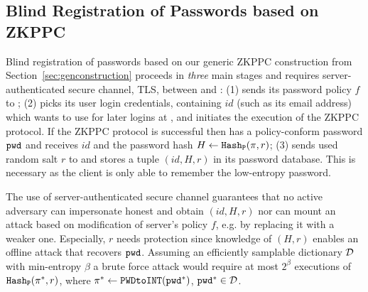 %


\subsection{Blind Registration of Passwords based on ZKPPC}\label{sec:pwreg}
Blind registration of passwords based on our generic \ac{ZKPPC} construction from Section~\ref{sec:genconstruction} proceeds in \emph{three} main stages and requires server-authenticated secure channel, \eg \ac{TLS}, between \Client and \Server: 
(1) \Server sends its password policy $f$ to \Client; 
(2) \Client picks its user login credentials, containing $id$ (such as its email address) which \Client wants to use for later logins at \Server, and initiates the execution of the \ac{ZKPPC} protocol. 
If the \ac{ZKPPC} protocol is successful then \Client has a policy-conform password $\mathtt{pwd}$ and \Server receives $id$ and the password hash $H\gets\mathtt{Hash_P}(\pi,r)$; 
(3) \Client sends used random salt $r$ to \Server and \Server stores a tuple $(id, H, r)$ in its password database.
This is necessary as the client is only able to remember the low-entropy password.

The use of server-authenticated secure channel guarantees that no active adversary \cA can impersonate honest \Server and obtain $(id, H, r)$ nor can \cA mount an attack based on modification of server's policy $f$, e.g. by replacing it with a weaker one.
Especially, $r$ needs protection since knowledge of $(H, r)$ enables an offline attack that recovers $\mathtt{pwd}$. Assuming an efficiently samplable dictionary $\mathcal{D}$ with min-entropy $\beta$ a brute force attack would require at most $2^\beta$ executions of $\mathtt{Hash_P}(\pi^\ast,r)$, where $\pi^\ast \gets \texttt{PWDtoINT}(\mathtt{pwd}^\ast)$, $\mathtt{pwd}^\ast\in\mathcal{D}$.

